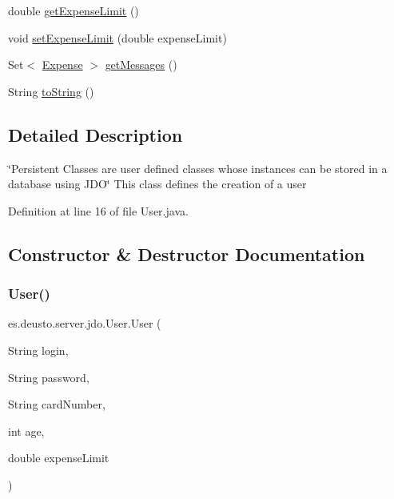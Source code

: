 \begin{DoxyCompactItemize}
\item 
double \hyperlink{classes_1_1deusto_1_1server_1_1jdo_1_1_user_a2c7f63a2e482c0037381990454289dfc}{get\+Expense\+Limit} ()
\item 
void \hyperlink{classes_1_1deusto_1_1server_1_1jdo_1_1_user_acb8264d9e7fd3f2ba112f66ddc28ddeb}{set\+Expense\+Limit} (double expense\+Limit)
\item 
Set$<$ \hyperlink{classes_1_1deusto_1_1server_1_1jdo_1_1_expense}{Expense} $>$ \hyperlink{classes_1_1deusto_1_1server_1_1jdo_1_1_user_ab92d6e8b0d6a275a2649ed10235fe9d9}{get\+Messages} ()
\item 
String \hyperlink{classes_1_1deusto_1_1server_1_1jdo_1_1_user_a65366a578a6dcc53e3a77d6eabbbf8cf}{to\+String} ()
\end{DoxyCompactItemize}


\subsection{Detailed Description}
\char`\"{}\+Persistent Classes are user defined classes whose instances can be stored in a database using J\+D\+O\char`\"{} This class defines the creation of a user 

Definition at line 16 of file User.\+java.



\subsection{Constructor \& Destructor Documentation}
\mbox{\label{classes_1_1deusto_1_1server_1_1jdo_1_1_user_ae35fdda3d2752485c075bc12679a917a}} 
\subsubsection{\texorpdfstring{User()}{User()}}
{\footnotesize\ttfamily es.\+deusto.\+server.\+jdo.\+User.\+User (\begin{DoxyParamCaption}\item[{String}]{login,  }\item[{String}]{password,  }\item[{String}]{card\+Number,  }\item[{int}]{age,  }\item[{double}]{expense\+Limit }\end{DoxyParamCaption})}

